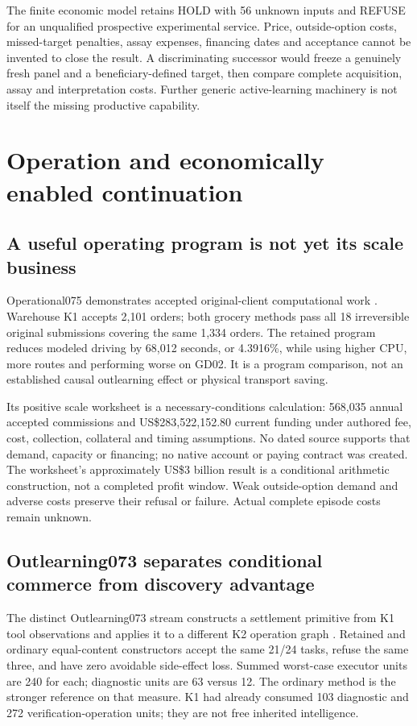 \documentclass[11pt,letterpaper]{article}
\begin{document}
The finite economic model retains HOLD with 56 unknown inputs and REFUSE for an unqualified prospective experimental service. Price, outside-option costs, missed-target penalties, assay expenses, financing dates and acceptance cannot be invented to close the result. A discriminating successor would freeze a genuinely fresh panel and a beneficiary-defined target, then compare complete acquisition, assay and interpretation costs. Further generic active-learning machinery is not itself the missing productive capability.

\section{Operation and economically enabled continuation}
\subsection{A useful operating program is not yet its scale business}
Operational075 demonstrates accepted original-client computational work \cite{operational075}. Warehouse K1 accepts 2,101 orders; both grocery methods pass all 18 irreversible original submissions covering the same 1,334 orders. The retained program reduces modeled driving by 68,012 seconds, or 4.3916\%, while using higher CPU, more routes and performing worse on GD02. It is a program comparison, not an established causal outlearning effect or physical transport saving.

Its positive scale worksheet is a necessary-conditions calculation: 568,035 annual accepted commissions and US\$283,522,152.80 current funding under authored fee, cost, collection, collateral and timing assumptions. No dated source supports that demand, capacity or financing; no native account or paying contract was created. The worksheet's approximately US\$3 billion result is a conditional arithmetic construction, not a completed profit window. Weak outside-option demand and adverse costs preserve their refusal or failure. Actual complete episode costs remain unknown.

\subsection{Outlearning073 separates conditional commerce from discovery advantage}
The distinct Outlearning073 stream constructs a settlement primitive from K1 tool observations and applies it to a different K2 operation graph \cite{outlearning073}. Retained and ordinary equal-content constructors accept the same 21/24 tasks, refuse the same three, and have zero avoidable side-effect loss. Summed worst-case executor units are 240 for each; diagnostic units are 63 versus 12. The ordinary method is the stronger reference on that measure. K1 had already consumed 103 diagnostic and 272 verification-operation units; they are not free inherited intelligence.
\end{document}
